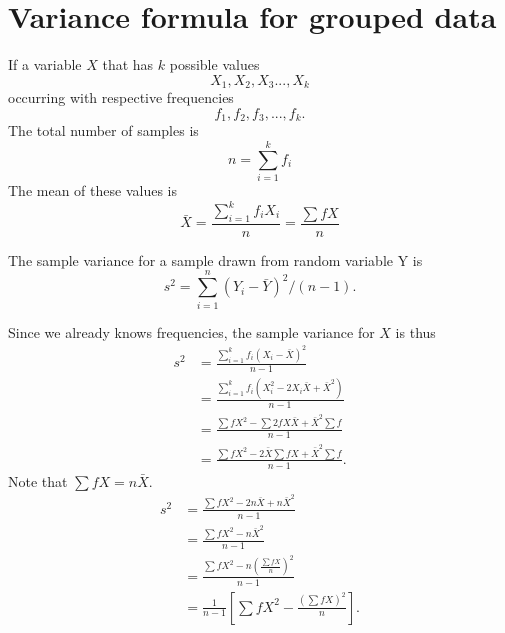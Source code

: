 \documentclass[12pt,letterpaper,fleqn]{article}
\begin{document}
\section{Variance formula for grouped data}
If a variable $X$ that has $k$ possible values
\begin{equation}
    X_1,X_2,X_3...,X_k
\end{equation}
occurring with respective frequencies
\begin{equation}
    f_1,f_2,f_3,...,f_k.
\end{equation}
The total number of samples is
\begin{equation}
    n = \sum_{i=1}^{k} f_i
\end{equation}
The mean of these values is
\begin{equation}
    \bar{X} = \frac{\sum_{i=1}^{k} f_i X_i}{n} = \frac{\sum fX}{n}
\end{equation}

The sample variance for a sample drawn from random variable Y is
\begin{equation}
    s^2 = \sum_{i=1}^{n}(Y_i - \bar{Y})^2/(n-1).
\end{equation}

Since we already knows frequencies, the sample variance for $X$ is thus
\begin{align}
    s^2
    &= \frac{\sum_{i=1}^{k}f_i (X_i-\bar{X})^2}{n-1} \\
    &= \frac{\sum_{i=1}^{k} f_i (X_i^2 - 2 X_i\bar{X}+\bar{X}^2)}{n-1} \\
    &= \frac{\sum f X^2 - \sum 2 f X\bar{X} + \bar{X}^2 \sum f }{n-1} \\
    &= \frac{\sum f X^2 - 2 \bar{X} \sum f X + \bar{X}^2 \sum f }{n-1}.
\end{align}
Note that $\sum f X = n \bar{X}$.
\begin{align}
    s^2
    &= \frac{\sum f X^2 - 2n \bar{X} + n\bar{X}^2}{n-1} \\
    &= \frac{\sum f X^2 - n \bar{X}^2}{n-1} \\
    &= \frac{\sum f X^2 - n (\frac{\sum fX}{n})^2}{n-1} \\
    &= \frac{1}{n-1} \left[ \sum f X^2 - \frac{(\sum fX)^2}{n} \right].
\end{align}
\end{document}
